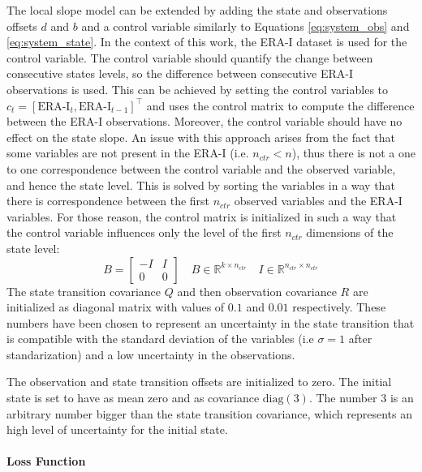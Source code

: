 \documentclass{article}
\begin{document}
The local slope model can be extended by adding the state and observations offsets $d$ and $b$ and a control variable similarly to Equations \ref{eq:system_obs} and \ref{eq:system_state}.
In the context of this work, the ERA-I dataset is used for the control variable. The control variable should quantify the change between consecutive states levels, so the difference between consecutive ERA-I observations is used. This can be achieved by setting the control variables to $c_t = [\text{ERA-I}_t, \text{ERA-I}_{t-1}]^\top$ and uses the control matrix to compute the difference between the ERA-I observations. Moreover, the control variable should have no effect on the state slope. An issue with this approach arises from the fact that some variables are not present in the ERA-I (i.e. $n_{ctr} < n$), thus there is not a one to one correspondence between the control variable and the observed variable, and hence the state level. This is solved by sorting the variables in a way that there is correspondence between the first $n_{ctr}$ observed variables and the ERA-I variables. For those reason, the control matrix is initialized in such a way that the control variable influences only the level of the first $n_{ctr}$ dimensions of the state level:
\[
B = \begin{bmatrix}-I & I \\ 0 & 0\end{bmatrix} \quad B \in \mathbb{R}^{k \times n_{ctr}} \quad I \in \mathbb{R}^{n_{ctr} \times n_{ctr}}
\]
The state transition covariance $Q$ and then observation covariance $R$ are initialized as diagonal matrix with values of $0.1$ and $0.01$ respectively. These numbers have been chosen to represent an uncertainty in the state transition that is compatible with the standard deviation of the variables (i.e $\sigma = 1$ after standarization) and a low uncertainty in the observations.

The observation and state transition offsets are initialized to zero. The initial state is set to have as mean zero and as covariance $\text{diag}(3)$. The number 3 is an arbitrary number bigger than the state transition covariance, which represents an high level of uncertainty for the initial state.

\paragraph{Loss Function}
\end{document}
